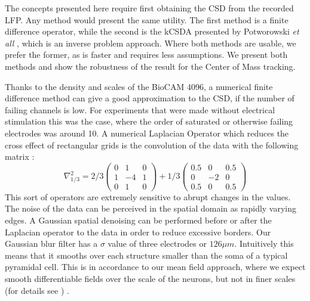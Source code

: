 \documentclass{article}
\begin{document}
The concepts presented here require first obtaining the CSD from the recorded LFP. Any method would present the same utility. The first method is a  finite difference operator, while the second is the kCSDA presented by Potworowski \emph{et all} \cite{Potworowski2011}, which is an inverse problem approach.  Where both methods are usable, we prefer the former, as is faster and requires less assumptions. We present both methods and show the robustness of the result for the Center of Mass tracking. 

Thanks to the density and scales of the BioCAM 4096, a numerical finite difference method
can give a good approximation to the CSD, if the number of failing channels is low. For experiments that were made without electrical stimulation this was the case, where the order of saturated or otherwise failing electrodes was around 10.  A  numerical Laplacian Operator which reduces the cross effect of rectangular grids is the convolution of the data with the following matrix \cite{Lindberg90}:
\begin{equation}
\nabla^2_{1/3}=2/3
\begin{pmatrix}
  0 & 1 & 0 \\
  1 & -4 & 1 \\
  0 & 1 & 0
\end{pmatrix}
+1/3
\begin{pmatrix}
  0.5 & 0 & 0.5 \\
  0 & -2 & 0 \\
  0.5 & 0 & 0.5
\end{pmatrix}  
\end{equation}
This sort of operators are extremely sensitive to abrupt changes in the values. The noise of the data can be perceived in the spatial domain as rapidly varying edges. A Gaussian spatial denoising can be performed before or after the Laplacian operator to the data in order to reduce excessive borders. Our Gaussian blur filter has a $\sigma$ value of three electrodes or $126 \mu m$. Intuitively this means that it smooths over each structure smaller than the soma of a typical pyramidal cell. 
This is  in accordance to our mean field approach, where we expect smooth differentiable fields over the scale of the neurons, but not in finer scales (for details see \cite{Bedard11}) .
\end{document}
